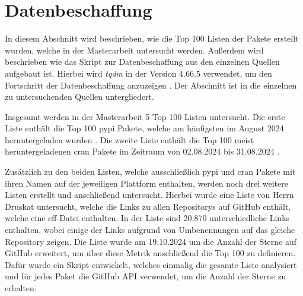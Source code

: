 \section{Datenbeschaffung}
\label{sec:datenbeschaffung}
In diesem Abschnitt wird beschrieben, wie die Top 100 Listen der Pakete erstellt wurden, welche in der Masterarbeit untersucht werden.
Außerdem wird beschrieben wie das Skript zur Datenbeschaffung aus den einzelnen Quellen aufgebaut ist.
Hierbei wird \emph{tqdm} in der Version 4.66.5 verwendet, um den Fortschritt der Datenbeschaffung anzuzeigen \autocite{costa-luis_tqdm_2024}.
Der Abschnitt ist in die einzelnen zu untersuchenden Quellen untergliedert.

Insgesamt werden in der Masterarbeit 5 Top 100 Listen untersucht.
Die erste Liste enthält die Top 100 \gls{pypi} Pakete, welche am häufigsten im August 2024 heruntergeladen wurden \autocite{kemenade_hugovktop-pypi-packages_2024}.
Die zweite Liste enthält die Top 100 meist heruntergeladenen \gls{cran} Pakete im Zeitraum von 02.08.2024 bis 31.08.2024 \autocite{csardi_r-hubcranlogsapp_2024}.

Zusätzlich zu den beiden Listen, welche ausschließlich \gls{pypi} und \gls{cran} Pakete mit ihren Namen auf der jeweiligen Plattform enthalten, werden noch drei weitere Listen erstellt und anschließend untersucht.
Hierbei wurde eine Liste von Herrn Druskat untersucht, welche die Links zu allen Repositorys auf GitHub enthält, welche eine \gls{cff}-Datei enthalten.
In der Liste sind 20.870 unterschiedliche Links enthalten, wobei einige der Links aufgrund von Umbenennungen auf das gleiche Repository zeigen.
Die Liste wurde am 19.10.2024 um die Anzahl der Sterne auf GitHub erweitert, um über diese Metrik anschließend die Top 100 zu definieren.
Dafür wurde ein Skript entwickelt, welches einmalig die gesamte Liste analysiert und für jedes Paket die GitHub API verwendet, um die Anzahl der Sterne zu erhalten.

